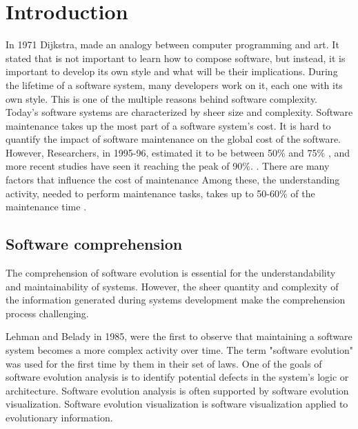 \chapter{Introduction}

In 1971 Dijkstra, made an analogy between computer programming and art. It stated that is not important to learn how to compose software, but instead, it is important to develop its own style and what will be their implications. 
During the lifetime of a software system, many developers work on it, each one with its own style. This is one of the multiple reasons behind software complexity. 
Today's software systems are characterized by sheer size and complexity. Software maintenance takes up the most part of a software system's cost. 
It is hard to quantify the impact of software maintenance on the global cost of the software. 
However, Researchers, in 1995-96, estimated it to be between 50\% and 75\% \cite{Davis1995} \cite{Sommerville1995}, and more recent studies have seen it reaching the peak of 90\%.  \cite{Erlikh2000} \cite{seacord2003}. There are many factors that influence the cost of maintenance Among these, the understanding activity, needed to perform maintenance tasks, takes up to 50-60\% of the maintenance time \cite{Corbi1989}. 


\section{Software comprehension}
The comprehension of software evolution is essential for the understandability and maintainability of systems.
However, the sheer quantity and complexity of the information generated during systems development make the comprehension process challenging.

Lehman and Belady in 1985, were the first to observe that maintaining a software system becomes a more complex activity over time. \cite{Lehman1985}
The term "software evolution" was used for the first time by them in their set of laws. 
One of the goals of software evolution analysis is to identify potential defects in the system's logic or architecture. 
Software evolution analysis is often supported by software evolution visualization.
Software evolution visualization is software visualization applied to evolutionary information.



